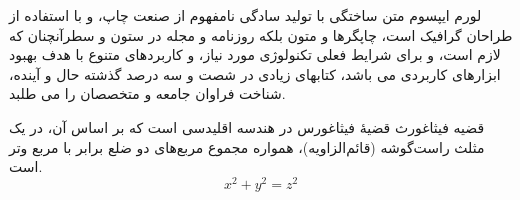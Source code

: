 \documentclass[
]{article}
\begin{document}
\begin{rmdthink}
لورم ایپسوم متن ساختگی با تولید سادگی نامفهوم از صنعت چاپ، و با استفاده
از طراحان گرافیک است، چاپگرها و متون بلکه روزنامه و مجله در ستون و
سطرآنچنان که لازم است، و برای شرایط فعلی تکنولوژی مورد نیاز، و کاربردهای
متنوع با هدف بهبود ابزارهای کاربردی می باشد، کتابهای زیادی در شصت و سه
درصد گذشته حال و آینده، شناخت فراوان جامعه و متخصصان را می طلبد.

\end{rmdthink}

\begin{Theorem}{قضیه فیثاغورث}
قضیهٔ فیثاغورس در هندسه اقلیدسی است که بر اساس آن، در یک مثلث راست‌گوشه
(قائم‌الزاویه)، همواره مجموع مربع‌های دو ضلع برابر با مربع وتر است.
\[x^2 + y^2 = z^2\]

\end{Theorem}
\end{document}
